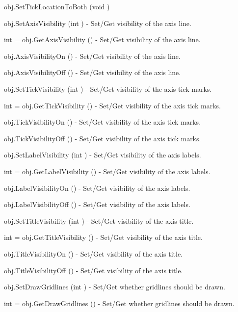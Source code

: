 \begin{DoxyItemize}
\item {\ttfamily obj.\-Set\-Tick\-Location\-To\-Both (void )}  
\item {\ttfamily obj.\-Set\-Axis\-Visibility (int )} -\/ Set/\-Get visibility of the axis line.  
\item {\ttfamily int = obj.\-Get\-Axis\-Visibility ()} -\/ Set/\-Get visibility of the axis line.  
\item {\ttfamily obj.\-Axis\-Visibility\-On ()} -\/ Set/\-Get visibility of the axis line.  
\item {\ttfamily obj.\-Axis\-Visibility\-Off ()} -\/ Set/\-Get visibility of the axis line.  
\item {\ttfamily obj.\-Set\-Tick\-Visibility (int )} -\/ Set/\-Get visibility of the axis tick marks.  
\item {\ttfamily int = obj.\-Get\-Tick\-Visibility ()} -\/ Set/\-Get visibility of the axis tick marks.  
\item {\ttfamily obj.\-Tick\-Visibility\-On ()} -\/ Set/\-Get visibility of the axis tick marks.  
\item {\ttfamily obj.\-Tick\-Visibility\-Off ()} -\/ Set/\-Get visibility of the axis tick marks.  
\item {\ttfamily obj.\-Set\-Label\-Visibility (int )} -\/ Set/\-Get visibility of the axis labels.  
\item {\ttfamily int = obj.\-Get\-Label\-Visibility ()} -\/ Set/\-Get visibility of the axis labels.  
\item {\ttfamily obj.\-Label\-Visibility\-On ()} -\/ Set/\-Get visibility of the axis labels.  
\item {\ttfamily obj.\-Label\-Visibility\-Off ()} -\/ Set/\-Get visibility of the axis labels.  
\item {\ttfamily obj.\-Set\-Title\-Visibility (int )} -\/ Set/\-Get visibility of the axis title.  
\item {\ttfamily int = obj.\-Get\-Title\-Visibility ()} -\/ Set/\-Get visibility of the axis title.  
\item {\ttfamily obj.\-Title\-Visibility\-On ()} -\/ Set/\-Get visibility of the axis title.  
\item {\ttfamily obj.\-Title\-Visibility\-Off ()} -\/ Set/\-Get visibility of the axis title.  
\item {\ttfamily obj.\-Set\-Draw\-Gridlines (int )} -\/ Set/\-Get whether gridlines should be drawn.  
\item {\ttfamily int = obj.\-Get\-Draw\-Gridlines ()} -\/ Set/\-Get whether gridlines should be drawn.  

\end{DoxyItemize}
